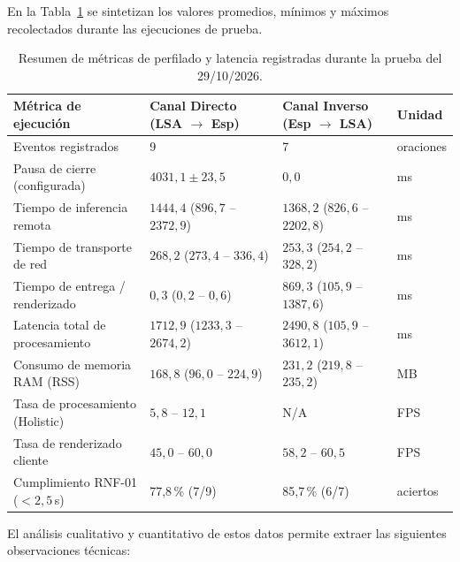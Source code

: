 En la Tabla~\ref{tab:telemetria_resumen} se sintetizan los valores promedios, mínimos y máximos recolectados durante las ejecuciones de prueba.

\begin{table}[H]
    \centering
    \small
    \caption{Resumen de métricas de perfilado y latencia registradas durante la prueba del 29/10/2026.}
    \label{tab:telemetria_resumen}
    \begin{tabularx}{\textwidth}{l X X X}
        \toprule
        \textbf{Métrica de ejecución} & \textbf{Canal Directo (LSA $\rightarrow$ Esp)} & \textbf{Canal Inverso (Esp $\rightarrow$ LSA)} & \textbf{Unidad} \\
        \midrule
        Eventos registrados & 9 & 7 & oraciones \\
        Pausa de cierre (configurada) & $4031{,}1 \pm 23{,}5$ & $0{,}0$ & ms \\
        Tiempo de inferencia remota & $1444{,}4$ ($896{,}7$ -- $2372{,}9$) & $1368{,}2$ ($826{,}6$ -- $2202{,}8$) & ms \\
        Tiempo de transporte de red & $268{,}2$ ($273{,}4$ -- $336{,}4$) & $253{,}3$ ($254{,}2$ -- $328{,}2$) & ms \\
        Tiempo de entrega / renderizado & $0{,}3$ ($0{,}2$ -- $0{,}6$) & $869{,}3$ ($105{,}9$ -- $1387{,}6$) & ms \\
        Latencia total de procesamiento & $1712{,}9$ ($1233{,}3$ -- $2674{,}2$) & $2490{,}8$ ($105{,}9$ -- $3612{,}1$) & ms \\
        Consumo de memoria RAM (RSS) & $168{,}8$ ($96{,}0$ -- $224{,}9$) & $231{,}2$ ($219{,}8$ -- $235{,}2$) & MB \\
        Tasa de procesamiento (Holistic) & $5{,}8$ -- $12{,}1$ & N/A & FPS \\
        Tasa de renderizado cliente & $45{,}0$ -- $60{,}0$ & $58{,}2$ -- $60{,}5$ & FPS \\
        Cumplimiento RNF-01 ($< 2{,}5$\,s) & 77{,}8\,\% (7/9) & 85{,}7\,\% (6/7) & aciertos \\
        \bottomrule
    \end{tabularx}
\end{table}

El análisis cualitativo y cuantitativo de estos datos permite extraer las siguientes observaciones técnicas:

